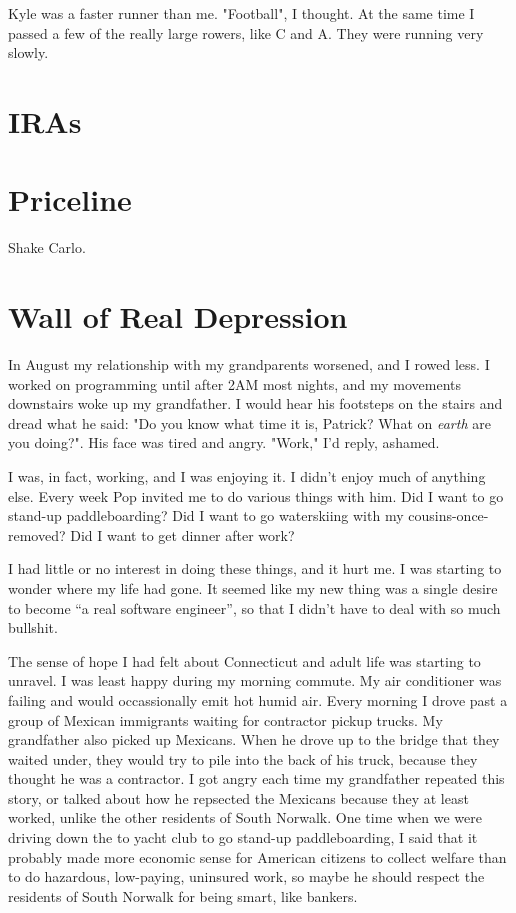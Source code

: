 Kyle was a faster runner than me.  "Football", I thought.  At the same time I
passed a few of the really large rowers, like C and A.  They were
running very slowly.  

\chapter{IRAs}


\chapter{Priceline}
Shake Carlo.  


\chapter{Wall of Real Depression}
In August my relationship with my grandparents worsened, and I rowed less.  I
worked on programming until after 2AM most nights, and my movements downstairs
woke up my grandfather.  I would hear his footsteps on the stairs and dread what
he said: "Do you know what time it is, Patrick?  What on \textit{earth} are you
doing?".  His face was tired and angry. "Work," I'd reply, ashamed.

I was, in fact, working, and I was enjoying it.  I didn't enjoy much of anything
else.  Every week Pop invited me to do various things with him.  Did I want to
go stand-up paddleboarding?  Did I want to go waterskiing with my cousins-once-
removed?  Did I want to get dinner after work?  

I had little or no interest in doing these things, and it hurt me.  I was
starting to wonder where my life had gone.  It seemed like my new thing was
a single desire to become ``a real software engineer'', so that I didn't have to
deal with so much bullshit.  

The sense of hope I had felt about Connecticut and adult life was starting to
unravel.  I was least happy during my morning commute.  My air conditioner was
failing and would occassionally emit hot humid air.  Every morning I drove past
a group of Mexican immigrants waiting for contractor pickup trucks.  My
grandfather also picked up Mexicans.  When he drove up to the bridge that they
waited under, they would try to pile into the back of his truck, because they
thought he was a contractor.  I got angry each time my grandfather repeated this
story, or talked about how he repsected the Mexicans because they at least
worked, unlike the other residents of South Norwalk.  One time when we were
driving down the to yacht club to go stand-up paddleboarding, I said that
it probably made more economic sense for American citizens to collect welfare
than to do hazardous, low-paying, uninsured work, so maybe he should respect the
residents of South Norwalk for being smart, like bankers. 

